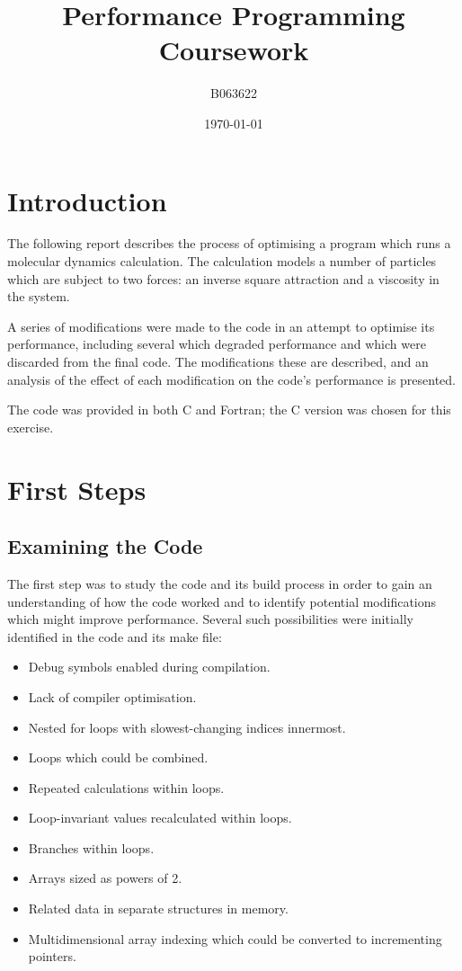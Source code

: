\documentclass[11pt, oneside]{article}   %
\title{Performance Programming \\ Coursework}
\author{B063622}
\date{\today}
\begin{document}
\maketitle

\newpage

\tableofcontents

\newpage


\section{Introduction}
The following report describes the process of optimising a program which runs a molecular dynamics calculation.
The calculation models a number of particles which are subject to two forces: an inverse square attraction and a viscosity in the system.

A series of  modifications were made to the code in an attempt to optimise its performance, including several which degraded performance and which were discarded from the final code.
The modifications these are described, and an analysis of the effect of each modification on the code's performance is presented.

The code was provided in both C and Fortran; the C version was chosen for this exercise.

\section{First Steps}

\subsection{Examining the Code}
The first step was to study the code and its build process in order to gain an understanding of how the code worked and to identify potential modifications which might improve performance.
Several such possibilities were initially identified in the code and its make file:

\begin{itemize}
	\item Debug symbols enabled during compilation.
	\item Lack of compiler optimisation.
	\item Nested for loops with slowest-changing indices innermost.
	\item Loops which could be combined.
	\item Repeated calculations within loops.
	\item Loop-invariant values recalculated within loops.
	\item Branches within loops.
	\item Arrays sized as powers of 2.
	\item Related data in separate structures in memory.
	\item Multidimensional array indexing which could be converted to incrementing pointers.
\end{itemize}
\end{document}

